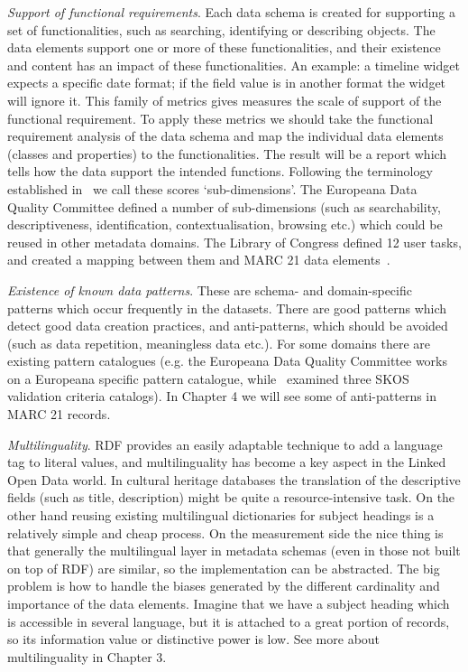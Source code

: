 \emph{Support of functional requirements}. Each data schema is created for supporting a set of functionalities, such as searching, identifying or describing objects. The data elements support one or more of these functionalities, and their existence and content has an impact of these functionalities. An example: a timeline widget expects a specific date format; if the field value is in another format the widget will ignore it. This family of metrics gives measures the scale of support of the functional requirement. To apply these metrics we should take the functional requirement analysis of the data schema and map the individual data elements (classes and properties) to the functionalities. The result will be a report which tells how the data support the intended functions. Following the terminology established in~\cite{gavrilis2015} we call these scores `sub-dimensions’. The Europeana Data Quality Committee defined a number of sub-dimensions (such as searchability, descriptiveness, identification, contextualisation, browsing etc.) which could be reused in other metadata domains. The Library of Congress defined 12 user tasks, and created a mapping between them and MARC 21 data elements~\cite{delsey2003, loc2006}.

\emph{Existence of known data patterns}. These are schema- and domain-specific patterns which occur frequently in the datasets. There are good patterns which detect good data creation practices, and anti-patterns, which should be avoided (such as data repetition, meaningless data etc.). For some domains there are existing pattern catalogues (e.g. the Europeana Data Quality Committee works on a Europeana specific pattern catalogue, while~\cite{suominen2012}  examined three SKOS validation criteria catalogs). In Chapter 4 we will see some of anti-patterns in MARC 21 records.

\emph{Multilinguality}. RDF provides an easily adaptable technique to add a language tag to literal values, and multilinguality has become a key aspect in the Linked Open Data world. In cultural heritage databases the translation of the descriptive fields (such as title, description) might be quite a resource-intensive task. On the other hand reusing existing multilingual dictionaries for subject headings is a relatively simple and cheap process. On the measurement side the nice thing is that generally the multilingual layer in metadata schemas (even in those not built on top of RDF) are similar, so the implementation can be abstracted. The big problem is how to handle the biases generated by the different cardinality and importance of the data elements. Imagine that we have a subject heading which is accessible in several language, but it is attached to a great portion of records, so its information value or distinctive power is low. See more about multilinguality in Chapter 3.

